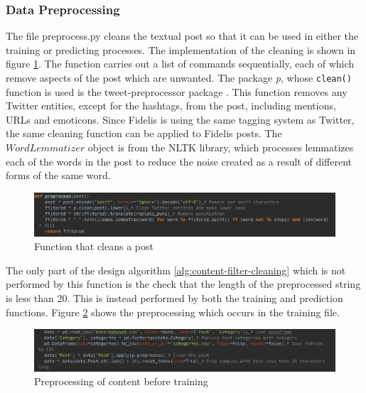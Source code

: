 \subsubsection{Data Preprocessing}
The file preprocess.py cleans the textual post so that it can be used in either the training or predicting processes. The implementation of the cleaning is shown in figure \ref{fig:content-clean}. The function carries out a list of commands sequentially, each of which remove aspects of the post which are unwanted. The package \textit{p}, whose \texttt{clean()} function is used is the tweet-preprocessor package \cite{TweetPreprocessor}. This function removes any Twitter entities, except for the hashtags, from the post, including mentions, URLs and emoticons. Since Fidelis is using the same tagging system as Twitter, the same cleaning function can be applied to Fidelis posts. The $WordLemmatizer$ object is from the NLTK library, which processes lemmatizes each of the words in the post to reduce the noise created as a result of different forms of the same word. 

\begin{figure}[H]
\centering
\includegraphics[width=\textwidth]{Images/Implementation/content-clean}
\caption{Function that cleans a post}
\label{fig:content-clean}
\end{figure}

The only part of the design algorithm \ref{alg:content-filter-cleaning} which is not performed by this function is the check that the length of the preprocessed string is less than 20. This is instead performed by both the training and prediction functions. Figure \ref{fig:content-preprocess} shows the preprocessing which occurs in the training file.

\begin{figure}[H]
\centering
\includegraphics[width=\textwidth]{Images/Implementation/content-preprocess}
\caption{Preprocessing of content before training}
\label{fig:content-preprocess}
\end{figure}

